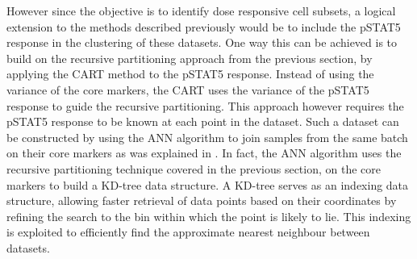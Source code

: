 However since the objective is to identify dose responsive cell subsets,
a logical extension to the methods described previously would be to include the pSTAT5 response
in the clustering of these datasets. 
One way this can be achieved is to build on the recursive partitioning approach from the previous section,
by applying the \acrfull{CART} method to the pSTAT5 response.
Instead of using the variance of the core markers, the \gls{CART} uses the variance of the pSTAT5 response to guide the recursive
partitioning.
This approach however requires the pSTAT5 response to be known at each point in the dataset.
Such a dataset can be constructed by using the \gls{ANN} algorithm to join samples from the same batch on their core markers
as was explained in .
In fact, the \gls{ANN} algorithm uses the recursive partitioning technique covered in the previous section, on the core markers to build a \gls{KD-tree} data structure.
A \gls{KD-tree}
serves as an indexing data structure, allowing faster retrieval of data points based on their coordinates
by refining the search to the bin within which the point is likely to lie.
This indexing is exploited to efficiently find the approximate nearest neighbour between datasets.

